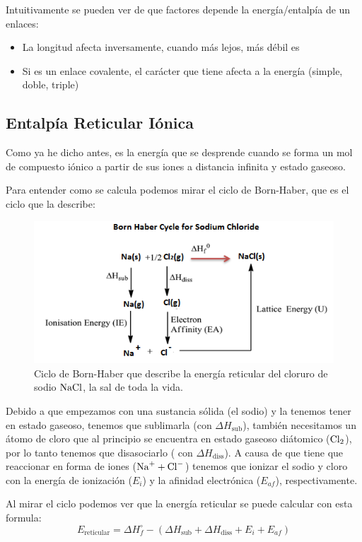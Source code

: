 \documentclass[arial,a4paper,print]{article}
\begin{document}
Intuitivamente se pueden ver de que factores depende la energía/entalpía de un enlaces: 
\begin{itemize}
\item La longitud afecta inversamente, cuando más lejos, más débil es
\item Si es un enlace covalente, el carácter que tiene afecta a la energía (simple, doble, triple)

\end{itemize}

\subsection{Entalpía Reticular Iónica}
Como ya he dicho antes, es la energía que se desprende cuando se forma un mol de compuesto iónico a partir de sus iones a distancia infinita y estado gaseoso.

Para entender como se calcula podemos mirar el ciclo de Born-Haber, que es el ciclo que la describe:
\begin{figure}[H]
	\centering
	\includegraphics[width=0.6\linewidth]{figures/born-haber}
	\caption{Ciclo de Born-Haber que describe la energía reticular del cloruro de sodio $\ce{NaCl}$, la sal de toda la vida. }
	\label{fig:born-haber}
\end{figure}

Debido a que empezamos con una sustancia sólida (el sodio) y la tenemos tener en estado gaseoso, tenemos que sublimarla (con $\Delta H_{\text{sub}}$), también necesitamos un átomo de cloro que al principio se encuentra en estado gaseoso diátomico ($\ce{Cl_2}$), por lo tanto tenemos que disasociarlo ( con $\Delta H_{\text{diss}}$). A causa de que tiene que reaccionar en forma de iones ($\ce{Na^+ + Cl^-}$) tenemos que ionizar el sodio y cloro con la energía de ionización ($E_{i}$) y la afinidad electrónica ($E_{af}$), respectivamente.  

Al mirar el ciclo podemos ver que la energía reticular se puede calcular con esta formula:
\begin{equation*}
	E_{\text{reticular}} = \Delta H^{\circ}_{f} - \left(\Delta H_{\text{sub}} + \Delta H_{\text{diss}} + E_{i} + E_{af}\right)
\end{equation*}
\end{document}
